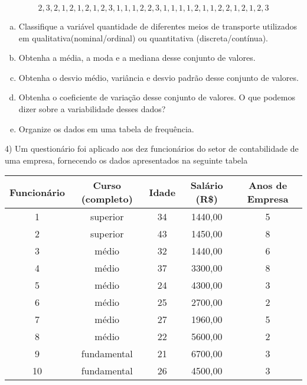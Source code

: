 \documentclass{article}
\begin{document}
$$2, 3, 2, 1, 2, 1, 2, 1, 2, 3, 1, 1, 1, 2, 2, 3, 1, 1, 1, 1, 2, 1, 1, 2, 2, 1, 2,
1 ,2, 3 $$

\begin{enumerate}[a)]
\item Classifique a variável quantidade de diferentes meios de transporte utilizados em qualitativa(nominal/ordinal) ou quantitativa (discreta/contínua).
\item Obtenha a média, a moda e a mediana desse conjunto de valores.
\item Obtenha o desvio médio, variância e desvio padrão desse conjunto de valores.
\item Obtenha o coeficiente de variação desse conjunto de valores. O que podemos dizer sobre a variabilidade desses dados?
\item Organize os dados em uma tabela de frequência.
\end{enumerate}

4) Um questionário foi aplicado aos dez funcionários do setor de contabilidade de uma empresa, fornecendo os dados apresentados na seguinte tabela
\begin{table}[H]
\begin{tabular}{ccccc}
\hline
Funcionário & Curso (completo) & Idade & Salário (R\$) & Anos de Empresa \\ \hline
1           & superior         & 34    & 1440,00       & 5               \\
2           & superior         & 43    & 1450,00       & 8               \\
3           & médio            & 32    & 1440,00       & 6               \\
4           & médio            & 37    & 3300,00       & 8               \\
5           & médio            & 24    & 4300,00       & 3               \\
6           & médio            & 25    & 2700,00       & 2               \\
7           & médio            & 27    & 1960,00       & 5               \\
8           & médio            & 22    & 5600,00       & 2               \\
9           & fundamental      & 21    & 6700,00       & 3               \\
10          & fundamental      & 26    & 4500,00       & 3               \\ \hline
\end{tabular}
\end{table}
\end{document}
